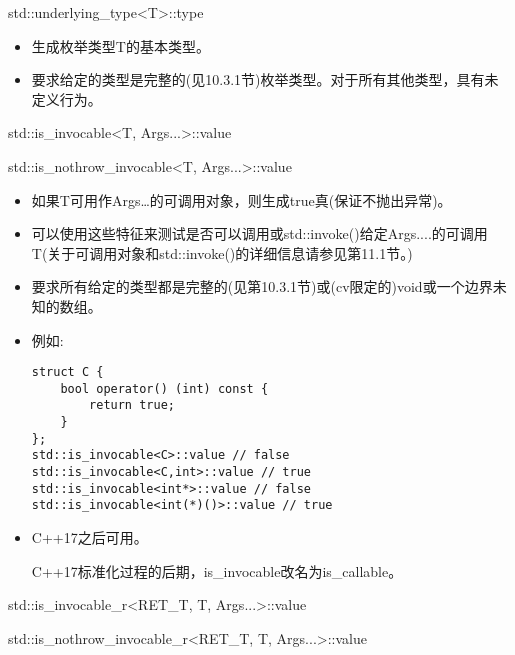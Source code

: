 std::underlying\_type<T>::type

\begin{itemize}
\item 
生成枚举类型T的基本类型。

\item 
要求给定的类型是完整的(见10.3.1节)枚举类型。对于所有其他类型，具有未定义行为。
\end{itemize}

std::is\_invocable<T, Args...>::value

std::is\_nothrow\_invocable<T, Args...>::value

\begin{itemize}
\item 
如果T可用作Args…的可调用对象，则生成true真(保证不抛出异常)。

\item 
可以使用这些特征来测试是否可以调用或std::invoke()给定Args....的可调用T(关于可调用对象和std::invoke()的详细信息请参见第11.1节。)

\item 
要求所有给定的类型都是完整的(见第10.3.1节)或(cv限定的)void或一个边界未知的数组。

\item 
例如:
\begin{lstlisting}[style=styleCXX]
struct C {
	bool operator() (int) const {
		return true;
	}
};
std::is_invocable<C>::value // false
std::is_invocable<C,int>::value // true
std::is_invocable<int*>::value // false
std::is_invocable<int(*)()>::value // true
\end{lstlisting}

\item 
C++17之后可用。

\begin{tcolorbox}[colback=webgreen!5!white,colframe=webgreen!75!black]
\hspace*{0.75cm}C++17标准化过程的后期，is\_invocable改名为is\_callable。
\end{tcolorbox}
\end{itemize}

std::is\_invocable\_r<RET\_T, T, Args...>::value

std::is\_nothrow\_invocable\_r<RET\_T, T, Args...>::value

